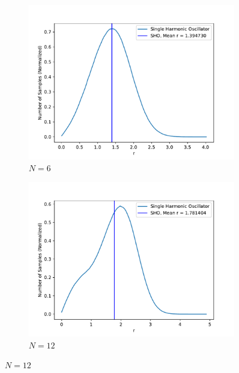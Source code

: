 \documentclass[../main.tex]{subfiles}
\begin{document}
\begin{figure}
\centering
\begin{subfigure}{0.48\textwidth}
\includegraphics[width=\linewidth]{figures/densitySHO/density_SHO_N6_Omega1_2d}
\caption{$N=6$} \label{fig:SHO_N6_2d_a}
\end{subfigure}\hspace*{\fill}
\begin{subfigure}{0.48\textwidth}
\includegraphics[width=\linewidth]{figures/densitySHO/density_SHO_N12_Omega1_2d}
\caption{$N=12$} \label{fig:SHO_N12_2d_b}
\end{subfigure}


\end{figure}
\end{document}
